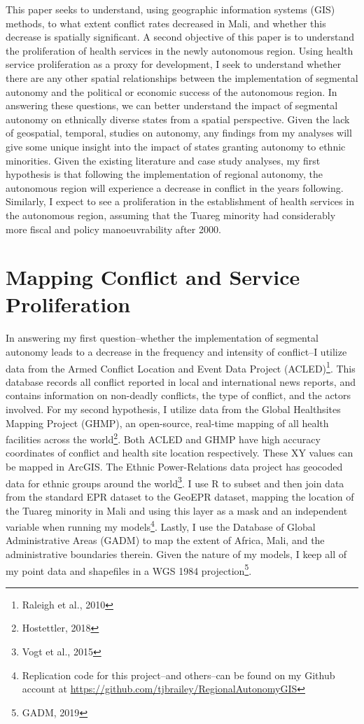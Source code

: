 \documentclass[12pt]{article}
\begin{document}
This paper seeks to understand, using geographic information systems (GIS) methods, to what extent conflict rates decreased in Mali, and whether this decrease is spatially significant. A second objective of this paper is to understand the proliferation of health services in the newly autonomous region. Using health service proliferation as a proxy for development, I seek to understand whether there are any other spatial relationships between the implementation of segmental autonomy and the political or economic success of the autonomous region. In answering these questions, we can better understand the impact of segmental autonomy on ethnically diverse states from a spatial perspective. Given the lack of geospatial, temporal, studies on autonomy, any findings from my analyses will give some unique insight into the impact of states granting autonomy to ethnic minorities. Given the existing literature and case study analyses, my first hypothesis is that following the implementation of regional autonomy, the autonomous region will experience a decrease in conflict in the years following. Similarly, I expect to see a proliferation in the establishment of health services in the autonomous region, assuming that the Tuareg minority had considerably more fiscal and policy manoeuvrability after 2000.

\section{Mapping Conflict and Service Proliferation}
In answering my first question--whether the implementation of segmental autonomy leads to a decrease in the frequency and intensity of conflict--I utilize data from the Armed Conflict Location and Event Data Project (ACLED)\footnote{Raleigh et al., 2010}. This database records all conflict reported in local and international news reports, and contains information on non-deadly conflicts, the type of conflict, and the actors involved. For my second hypothesis, I utilize data from the Global Healthsites Mapping Project (GHMP), an open-source, real-time mapping of all health facilities across the world\footnote{Hostettler, 2018}. Both ACLED and GHMP have high accuracy coordinates of conflict and health site location respectively. These XY values can be mapped in ArcGIS. The Ethnic Power-Relations data project has geocoded data for ethnic groups around the world\footnote{Vogt et al., 2015}. I use R to subset and then join data from the standard EPR dataset to the GeoEPR dataset, mapping the location of the Tuareg minority in Mali and using this layer as a mask and an independent variable when running my models\footnote{Replication code for this project--and others--can be found on my Github account at \href{https://github.com/tjbrailey/RegionalAutonomyGIS}{https://github.com/tjbrailey/RegionalAutonomyGIS}}. Lastly, I use the Database of Global Administrative Areas (GADM) to map the extent of Africa, Mali, and the administrative boundaries therein. Given the nature of my models, I keep all of my point data and shapefiles in a WGS 1984 projection\footnote{GADM, 2019}. 
\end{document}
